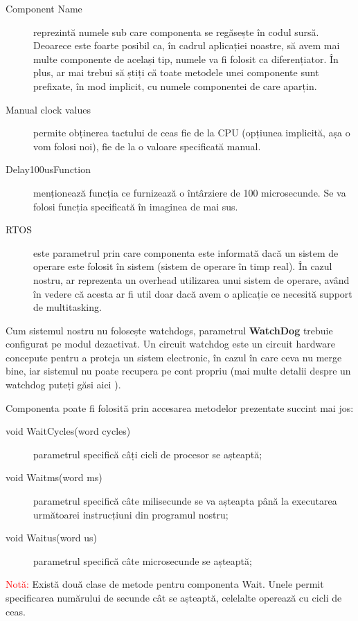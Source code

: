 \begin{description}
    \item[Component Name] reprezintă numele sub care componenta se regăsește în codul sursă. Deoarece este foarte posibil ca, în cadrul aplicației noastre, să avem mai multe componente de același tip, numele va fi folosit ca diferențiator. În plus, ar mai trebui să știți că toate metodele unei componente sunt prefixate, în mod implicit, cu numele componentei de care aparțin.
    \item[Manual clock values] permite obținerea tactului de ceas fie de la CPU (opțiunea implicită, așa o vom folosi noi), fie de la o valoare specificată manual.
    \item[Delay100usFunction] menționează funcția ce furnizează o întârziere de 100 microsecunde. Se va folosi funcția specificată în imaginea de mai sus.
    \item[RTOS] este parametrul prin care componenta este informată dacă un sistem de operare este folosit în sistem (sistem de operare în timp real). În cazul nostru, ar reprezenta un overhead utilizarea unui sistem de operare, având în vedere că acesta ar fi util doar dacă avem o aplicație ce necesită support de multitasking.
\end{description}

Cum sistemul nostru nu folosește watchdogs, parametrul \textbf{WatchDog} trebuie configurat pe modul dezactivat. Un circuit watchdog este un circuit hardware concepute pentru a proteja un sistem electronic, în cazul în care ceva nu merge bine, iar sistemul nu poate recupera pe cont propriu (mai multe detalii despre un watchdog puteți găsi aici \cite{watchdogBib}).

Componenta poate fi folosită prin accesarea metodelor prezentate succint mai jos:

\begin{description}
    \item[void WaitCycles(word cycles)] parametrul specifică câți cicli de procesor se așteaptă;
    \item[void Waitms(word ms)] parametrul specifică câte milisecunde se va așteapta până la executarea următoarei instrucțiuni din programul nostru;
    \item[void Waitus(word us)] parametrul specifică câte microsecunde se așteaptă;
\end{description}

\textcolor{red}{Notă:} Există două clase de metode pentru componenta Wait. Unele permit specificarea numărului de secunde cât se așteaptă, celelalte operează cu cicli de ceas.

